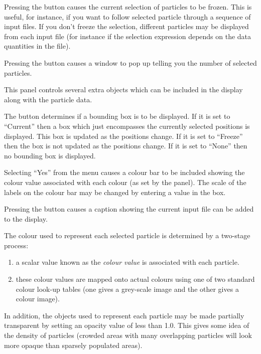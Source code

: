 \begin{description}
Pressing the  button causes the current
selection of particles to be frozen. This is useful, for instance, if you
want to follow selected particle through a sequence of input files. If
you don't freeze the selection, different particles may be displayed from
each input file (for instance if the selection expression depends on the
data quantities in the file).

Pressing the  button causes a window to
pop up telling you the number of selected particles.

This panel controls several extra objects which can be included in the
display along with the particle data.

The  button determines if a bounding box is to be
displayed. If it is set to ``Current'' then a box which just encompasses
the currently selected positions is displayed. This box is updated as the
positions change. If it is set to ``Freeze'' then the box is not updated as
the positions change. If it is set to ``None'' then no bounding box is
displayed.

Selecting ``Yes'' from the  menu causes a colour
bar to be included showing the colour value associated with each
colour (as set by the  panel).
The scale of the labels on the colour bar may be changed by entering a
value in the  box.

Pressing the  button causes a caption
showing the current input file can be added to the display.

The colour used to represent each selected particle is determined by a
two-stage process:

\begin{enumerate}

\item a scalar value known as the {\em colour value} is associated with each
particle.

\item these colour values are mapped onto actual colours using one of two
standard colour look-up tables (one gives a grey-scale image and the
other gives a colour image).

\end{enumerate}

In addition, the objects used to represent each particle may be made
partially transparent by setting an opacity value of less than 1.0. This
gives some idea of the density of particles (crowded areas with many
overlapping particles will look more opaque than sparsely populated
areas).


\end{description}
